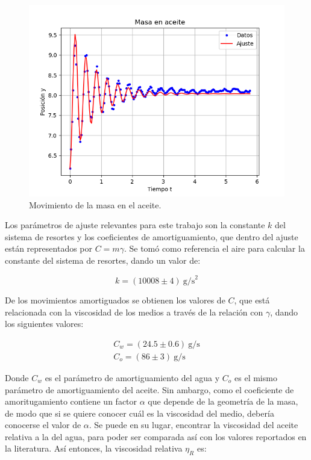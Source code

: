 \documentclass[final,5p,times,twocolumn, nopreprintline]{elsarticle}
\numberwithin{equation}{section}
\begin{document}
\begin{figure}[h!]
\begin{center}
\includegraphics[width=\columnwidth]{../aceite.png} 
\end{center}
\caption{Movimiento de la masa en el aceite.}
\end{figure}\label{fig4.3}

Los parámetros de ajuste relevantes para este trabajo son la constante $k$ del sistema de resortes y los coeficientes de amortiguamiento, que dentro del ajuste están representados por $C=m\gamma$. Se tomó como referencia el aire para calcular la constante del sistema de resortes, dando un valor de:

\begin{equation}
k=(10008\pm 4)~\text{g/s}^2
\end{equation}\label{eq4.1}

De los movimientos amortiguados se obtienen los valores de $C$, que está relacionada con la viscosidad de los medios a través de la relación con $\gamma$, dando los siguientes valores:

\begin{align}
C_w = (24.5\pm0.6)~\text{g/s}\\
C_o = (86\pm3)~\text{g/s}
\end{align}\label{eq4.2}

Donde $C_w$ es el parámetro de amortiguamiento del agua y $C_o$ es el mismo parámetro de amortiguamiento del aceite. Sin ambargo, como el coeficiente de amoritugamiento contiene un factor $\alpha$ que depende de la geometría de la masa, de modo que si se quiere conocer cuál es la viscosidad del medio, debería conocerse el valor de $\alpha$. Se puede en su lugar, encontrar la viscosidad del aceite relativa a la del agua, para poder ser comparada así con los valores reportados en la literatura. Así entonces, la viscosidad relativa $\eta_R$ es:
\end{document}

